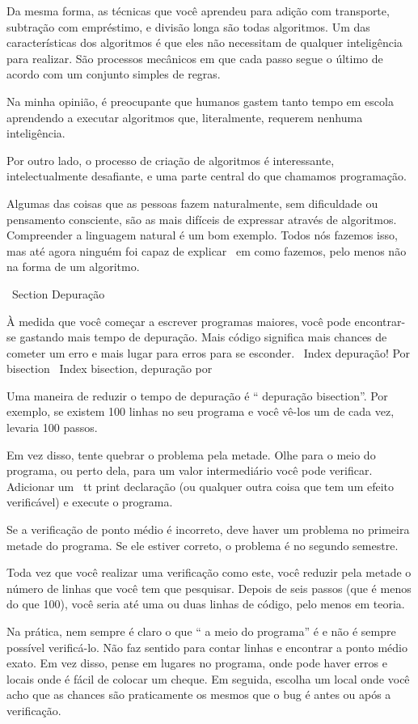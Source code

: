 \documentclass[10pt]{book}
\begin{document}
\begin {itemize}
{{{{Da mesma forma, as técnicas que você aprendeu para adição com transporte,
subtração com empréstimo, e divisão longa são todas algoritmos. Um
das características dos algoritmos é que eles não necessitam de qualquer
inteligência para realizar. São processos mecânicos em que
cada passo segue o último de acordo com um conjunto simples de regras.

Na minha opinião, é preocupante que humanos gastem tanto tempo em
escola aprendendo a executar algoritmos que, literalmente, requerem
nenhuma inteligência.

Por outro lado, o processo de criação de algoritmos é interessante,
intelectualmente desafiante, e uma parte central do que chamamos
programação.

Algumas das coisas que as pessoas fazem naturalmente, sem dificuldade ou
pensamento consciente, são as mais difíceis de expressar através de algoritmos.
Compreender a linguagem natural é um bom exemplo. Todos nós fazemos isso, mas
até agora ninguém foi capaz de explicar {\ em como} fazemos, pelo menos
não na forma de um algoritmo.


\ Section {} Depuração

À medida que você começar a escrever programas maiores, você pode encontrar-se
gastando mais tempo de depuração. Mais código significa mais chances de
cometer um erro e mais lugar para erros para se esconder.
\ Index {depuração! Por bisection}
\ Index {bisection, depuração por}

Uma maneira de reduzir o tempo de depuração é `` depuração bisection''.
Por exemplo, se existem 100 linhas no seu programa e você
vê-los um de cada vez, levaria 100 passos.

Em vez disso, tente quebrar o problema pela metade. Olhe para o meio
do programa, ou perto dela, para um valor intermediário você
pode verificar. Adicionar um {\ tt print} declaração (ou qualquer outra coisa
que tem um efeito verificável) e execute o programa.

Se a verificação de ponto médio é incorreto, deve haver um problema no
primeira metade do programa. Se ele estiver correto, o problema é
no segundo semestre.

Toda vez que você realizar uma verificação como este, você reduzir pela metade o número de
linhas que você tem que pesquisar. Depois de seis passos (que é menos do que 100),
você seria até uma ou duas linhas de código, pelo menos em teoria.

Na prática, nem sempre é claro o que
`` a meio do programa'' é e não é sempre possível
verificá-lo. Não faz sentido para contar linhas e encontrar a
ponto médio exato. Em vez disso, pense em lugares
no programa, onde pode haver erros e locais onde
é fácil de colocar um cheque. Em seguida, escolha um local onde você
acho que as chances são praticamente os mesmos que o bug é antes
ou após a verificação.




}}}}
\end{itemize}
\end{document}
